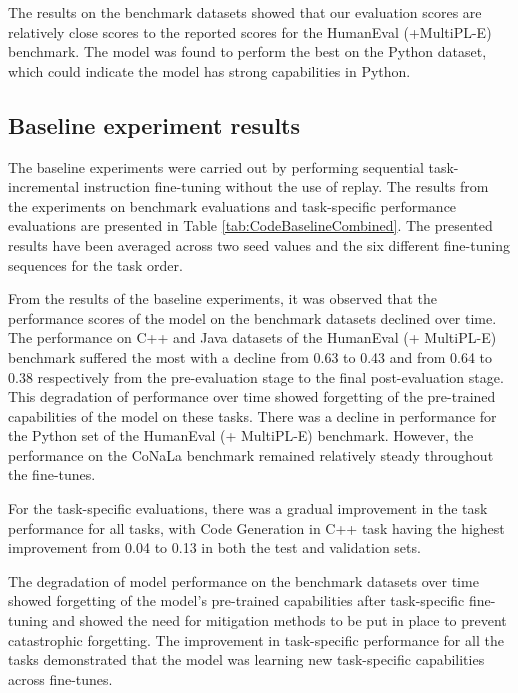 The results on the benchmark datasets showed that our evaluation scores are relatively close scores to the reported scores for the HumanEval (+MultiPL-E) benchmark. The model was found to perform the best on the Python dataset, which could indicate the model has strong capabilities in Python.

\subsection{Baseline experiment results}
The baseline experiments were carried out by performing sequential task-incremental instruction fine-tuning without the use of replay. The results from the experiments on benchmark evaluations and task-specific performance evaluations are presented in Table \ref{tab:CodeBaselineCombined}. The presented results have been averaged across two seed values and the six different fine-tuning sequences for the task order.

% 


From the results of the baseline experiments, it was observed that the performance scores of the model on the benchmark datasets declined over time. The performance on C++ and Java datasets of the HumanEval (+ MultiPL-E) benchmark suffered the most with a decline from 0.63 to 0.43 and from 0.64 to 0.38 respectively from the pre-evaluation stage to the final post-evaluation stage. This degradation of performance over time showed forgetting of the pre-trained capabilities of the model on these tasks. There was a decline in performance for the Python set of the HumanEval (+ MultiPL-E) benchmark. However, the performance on the CoNaLa benchmark remained relatively steady throughout the fine-tunes.

For the task-specific evaluations, there was a gradual improvement in the task performance for all tasks, with Code Generation in C++ task having the highest improvement from 0.04 to 0.13 in both the test and validation sets. 

The degradation of model performance on the benchmark datasets over time showed forgetting of the model’s pre-trained capabilities after task-specific fine-tuning and showed the need for mitigation methods to be put in place to prevent catastrophic forgetting. The improvement in task-specific performance for all the tasks demonstrated that the model was learning new task-specific capabilities across fine-tunes.


